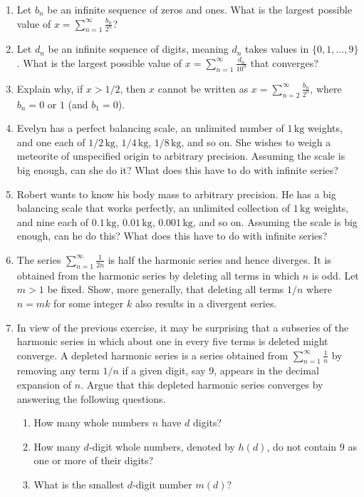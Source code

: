 \documentclass{exercises}
\begin{document}
\begin{enumerate}[resume]
\item Let $b_{n}$ be an infinite sequence of zeros and ones. What is the largest possible value of $x=\sum_{n=1}^{\infty}\frac{b_{n}}{2^{n}}$?
\item Let $d_{n}$ be an infinite sequence of digits, meaning $d_{n}$ takes values in $\{0,1,\ldots,9\}$. What is the largest possible value of $x=\sum_{n=1}^{\infty}\frac{d_{n}}{10^{n}}$ that converges?
\item Explain why, if $x>1/2$, then $x$ cannot be written as $x=\sum_{n=2}^{\infty}\frac{b_{n}}{2^{n}}$, where $b_{n}=0$ or $1$ (and $b_{1}=0$).
\item \techrequired Evelyn has a perfect balancing scale, an unlimited number of $1\,\text{kg}$ weights, and one each of $1/2\,\text{kg}$, $1/4\,\text{kg}$, $1/8\,\text{kg}$, and so on. She wishes to weigh a meteorite of unspecified origin to arbitrary precision. Assuming the scale is big enough, can she do it? What does this have to do with infinite series?
\item \techrequired Robert wants to know his body mass to arbitrary precision. He has a big balancing scale that works perfectly, an unlimited collection of $1\,\text{kg}$ weights, and nine each of $0.1\,\text{kg}$, $0.01\,\text{kg}$, $0.001\,\text{kg}$, and so on. Assuming the scale is big enough, can he do this? What does this have to do with infinite series?
\item The series $\sum_{n=1}^{\infty}\frac{1}{2n}$ is half the harmonic series and hence diverges. It is obtained from the harmonic series by deleting all terms in which $n$ is odd. Let $m>1$ be fixed. Show, more generally, that deleting all terms $1/n$ where $n=mk$ for some integer $k$ also results in a divergent series.
\item In view of the previous exercise, it may be surprising that a subseries of the harmonic series in which about one in every five terms is deleted might converge. A depleted harmonic series is a series obtained from $\sum_{n=1}^{\infty}\frac{1}{n}$ by removing any term $1/n$ if a given digit, say $9$, appears in the decimal expansion of $n$. Argue that this depleted harmonic series converges by answering the following questions.
\begin{enumerate}[label=(\alph*)]
  \item How many whole numbers $n$ have $d$ digits?
  \item How many $d$-digit whole numbers, denoted by $h(d)$, do not contain $9$ as one or more of their digits?
  \item What is the smallest $d$-digit number $m(d)$?

\end{enumerate}
\end{enumerate}
\end{document}
